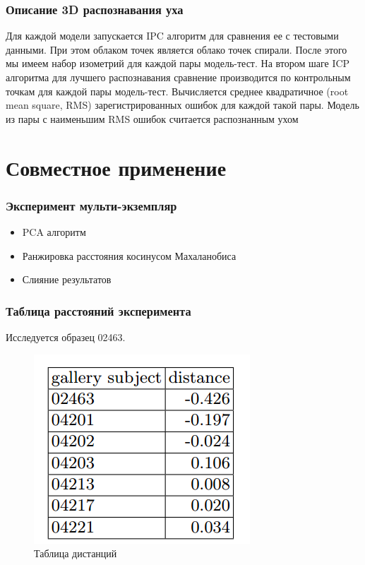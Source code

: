 \documentclass{beamer}
\begin{document}
\begin{frame}
\frametitle{Описание 3D распознавания уха}

Для каждой модели запускается IPC алгоритм для сравнения ее с тестовыми данными.
При этом облаком точек является облако точек спирали.
После этого мы имеем набор изометрий для каждой пары модель-тест. 
На втором шаге ICP алгоритма для лучшего распознавания сравнение производится по контрольным точкам для каждой пары модель-тест. 
Вычисляется среднее квадратичное (root mean square, RMS) зарегистрированных ошибок для каждой такой пары. 
Модель из пары с наименьшим RMS ошибок считается распознанным ухом

\end{frame}

\section{Совместное применение}

\begin{frame}
\frametitle{Эксперимент мульти-экземпляр}

\begin{itemize}
\item PCA алгоритм
\item Ранжировка расстояния косинусом Махаланобиса
\item Слияние результатов
\end{itemize}

\end{frame}


\begin{frame}
\frametitle{Таблица расстояний эксперимента}

Исследуется образец 02463. 

\begin{figure}[h!]
\centering
\includegraphics[scale=0.50]{res/distances_table}
\caption{Таблица дистанций}
\end{figure}

\end{frame}
\end{document}
